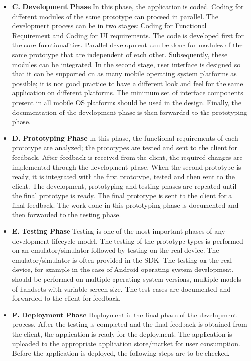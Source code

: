 \documentclass[10pt,slovak,a4paper]{article}
\begin{document}
\begin{itemize}
  \item \textbf{C. Development Phase}
In this phase, the application is coded. Coding for different modules of the same prototype can proceed in parallel. The development process can be in two stages: Coding for Functional Requirement and Coding for UI requirements. The code is developed first for the core functionalities. Parallel development can be done for modules of the same prototype that are independent of each other. Subsequently, these modules can be integrated. In the second stage, user interface is designed so that it can be supported on as many mobile operating system platforms as possible; it is not good practice to have a different look and feel for the same application on different platforms. The minimum set of interface components present in all mobile OS platforms should be used in the design. Finally, the documentation of the development phase is then forwarded to the prototyping phase.
  \item \textbf{D. Prototyping Phase}
In this phase, the functional requirements of each prototype are analyzed; the prototypes are tested and sent to the client for feedback. After feedback is received from the client, the required changes are implemented through the development phase. When the second prototype is ready, it is integrated with the first prototype, tested and then sent to the client. The development, prototyping and testing phases are repeated until the final prototype is ready. The final prototype is sent to the client for a final feedback. The work done in this prototyping phase is documented and then forwarded to the testing phase.
  \item \textbf{E. Testing Phase}
Testing is one of the most important phases of any development lifecycle model. The testing of the prototype types is performed on an emulator/simulator followed by testing on the real device. The emulator/simulator is often provided in the SDK. The testing on the real device, for example in the case of Android operating system development, should be performed on multiple operating system versions, multiple models of handsets with variable screen size. The test cases are documented and forwarded to the client for feedback.
  \item \textbf{F. Deployment Phase}
Deployment is the final phase of the development process. After the testing is completed and the final feedback is obtained from the client, the application is ready for the deployment. The application is uploaded to the appropriate application store/market for user consumption. Before the application is deployed, the following steps are to be checked.

\end{itemize}
\end{document}
